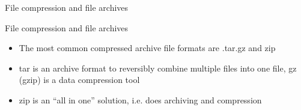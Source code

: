 \documentclass[aspectratio=1610]{beamer}
\newcommand\curtitle{}
\newenvironment{shells}[1]{
    \begin{tikzpicture}[codebox/.append style={text width=#1-18pt}]
        \coordinate (code);
}{
    \end{tikzpicture}
}
\newcommand\command[1]{\alert{\textbf{\texttt{#1}}}}
\begin{document}


\renewcommand\curtitle{File compression and file archives}

\begin{frame}[c]
    \Huge \curtitle
\end{frame}


\begin{frame}[c]{\curtitle}
    \begin{itemize}\setlength\itemsep{1em}
        \item The most common compressed archive file formats are \alert{.tar.gz} and \alert{zip}
        \item \alert{tar} is an archive format to reversibly combine multiple files into one file,
            \alert{gz} (gzip) is a data compression tool
        \item \alert{zip} is an \enquote{all in one} solution, i.e. does archiving and compression
    \end{itemize}
\end{frame}

\renewcommand\curtitle{ZIP file handling}
\end{document}
